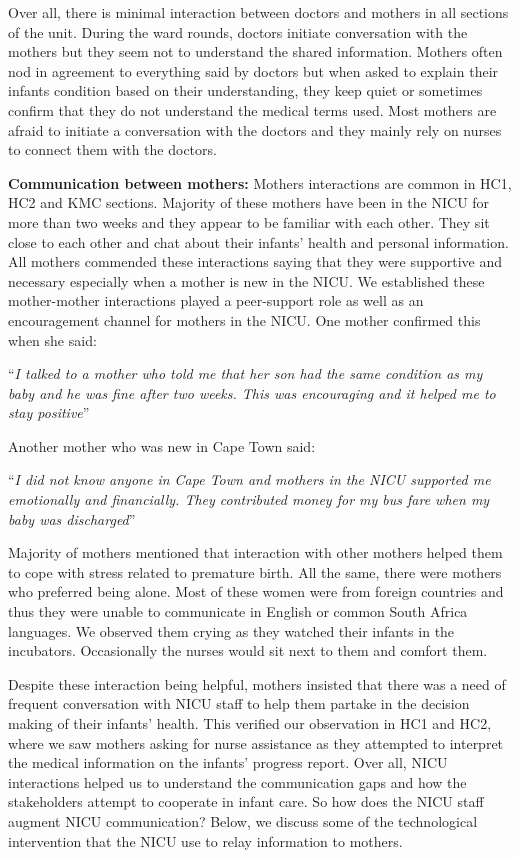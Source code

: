 Over all, there is minimal interaction between doctors and mothers in all sections of the unit. During the ward rounds, doctors initiate conversation with the mothers but they seem not to understand the shared information. Mothers often nod in agreement to everything said by doctors but when asked to explain their infants condition based on their understanding, they keep quiet or sometimes confirm that they do not understand the medical terms used. Most mothers are afraid to initiate a conversation with the doctors and they mainly rely on nurses to connect them with the doctors.

\textbf{Communication between mothers:}
Mothers interactions are common in HC1, HC2 and KMC sections. Majority of these mothers have been in the NICU for more than two weeks and they appear to be familiar with each other. They sit close to each other and chat about their infants' health and personal information. All mothers commended these interactions saying that they were supportive and necessary especially when a mother is new in the NICU. We established these mother-mother interactions played a  peer-support role as well as an encouragement channel for mothers in the NICU. One mother confirmed this when she said:

 \enquote{\itshape I talked to a mother who told me that her son had the same condition as my baby and he was fine after two weeks. This was encouraging and it helped me to stay positive}

Another mother who was new in Cape Town said:

\enquote{\itshape I did not know anyone in Cape Town and mothers in the NICU supported me emotionally and financially. They contributed money for my bus fare when my baby was discharged}

Majority of mothers mentioned that interaction with other mothers helped them to cope with stress related to premature birth. All the same, there were mothers who preferred being alone. Most of these women were from foreign countries and thus they were unable to communicate in English or common South Africa languages. We observed them crying as they watched their infants in the incubators. Occasionally the nurses would sit next to them and comfort them. 

Despite these interaction being helpful, mothers insisted that there was a need of frequent conversation with NICU staff to help them partake in the decision making of their infants' health. This verified our observation in HC1 and HC2, where we saw mothers asking for nurse assistance as they attempted to interpret the medical information on the infants' progress report. Over all, NICU interactions helped us to understand the communication gaps and how the stakeholders attempt to cooperate in infant care. So how does the NICU staff augment NICU communication? Below, we discuss some of the technological intervention that the NICU use to relay information to mothers.


